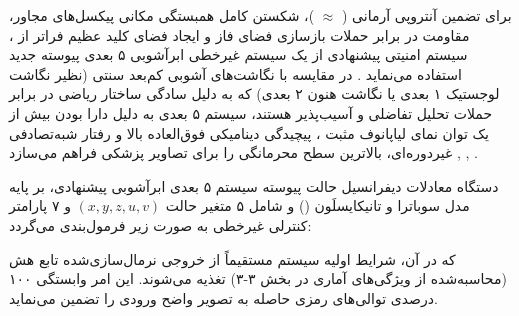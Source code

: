 



برای تضمین آنتروپی آرمانی ( \ensuremath{\approx} )، شکستن کامل همبستگی مکانی پیکسل‌های مجاور، مقاومت در برابر حملات بازسازی فضای فاز  و ایجاد فضای کلید عظیم فراتر از ، سیستم امنیتی پیشنهادی از یک سیستم غیرخطی ابرآشوبی ۵ بعدی پیوسته جدید استفاده می‌نماید . در مقایسه با نگاشت‌های آشوبی کم‌بعد سنتی (نظیر نگاشت لوجستیک ۱ بعدی یا نگاشت هنون ۲ بعدی) که به دلیل سادگی ساختار ریاضی در برابر حملات تحلیل تفاضلی و  آسیب‌پذیر هستند، سیستم ۵ بعدی به دلیل دارا بودن بیش از یک توان نمای لیاپانوف مثبت ، پیچیدگی دینامیکی فوق‌العاده بالا و رفتار شبه‌تصادفی غیردوره‌ای، بالاترین سطح محرمانگی را برای تصاویر پزشکی فراهم می‌سازد , , .\par




دستگاه معادلات دیفرانسیل حالت پیوسته سیستم ۵ بعدی ابرآشوبی پیشنهادی، بر پایه مدل سوباترا و تانیکایسلَون (\cite{Subathra2025}) و شامل ۵ متغیر حالت $(x, y, z, u, v)$ و ۷ پارامتر کنترلی غیرخطی به صورت زیر فرمول‌بندی می‌گردد:\par






که در آن، شرایط اولیه سیستم  مستقیماً از خروجی نرمال‌سازی‌شده تابع هش  (محاسبه‌شده از ویژگی‌های آماری  در بخش ۳{-}۳) تغذیه می‌شوند. این امر وابستگی ۱۰۰ درصدی توالی‌های رمزی حاصله به تصویر واضح ورودی را تضمین می‌نماید.\par

